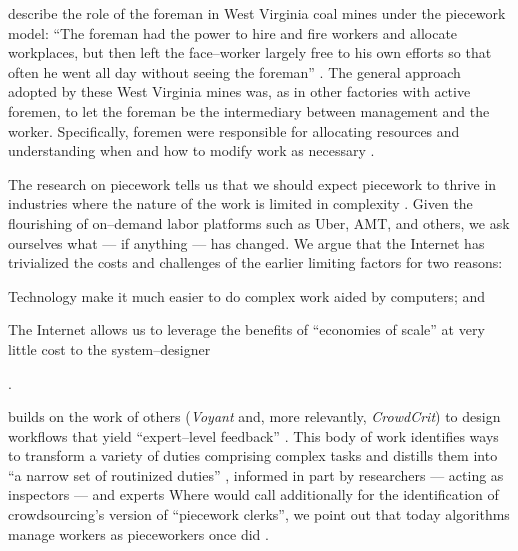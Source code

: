 \documentclass[trackingWork]{subfiles}
\begin{document}
\citeauthor{10.2307/2118435} describe the role of the foreman in West Virginia coal mines under the piecework model:
``The foreman had the power to hire and fire workers and allocate workplaces,
but then left the face--worker largely free to his own efforts so that
often he went all day without seeing the foreman''
\cite{10.2307/2118435}.
The general approach adopted by these West Virginia mines was,
as in other factories with active foremen,
to let the foreman be the intermediary between management and the worker.
Specifically, foremen were responsible for allocating resources and
understanding when and how to modify work as necessary
\cite{wray1949marginal}.


\subsubsubsection{\whatchanged}
The research on piecework tells us that
we should expect piecework to thrive in industries where
the nature of the work is limited in complexity
\cite{Brown01041990}.
Given the flourishing of on--demand labor platforms such as
Uber, AMT, and others, we ask ourselves
what --- if anything --- has changed.
We argue that
the Internet has trivialized
the costs and challenges of the earlier limiting factors for two reasons:
\begin{inlinelist}
  \item Technology make it much easier to do complex work aided by computers; and %
  \item The Internet allows us to leverage the benefits of
        ``economies of scale'' at very little cost
        to the system--designer \cite{lessig2006code,miller2011understanding}
\end{inlinelist}.

\citeauthor{yuanAlmost} builds on the work of others
(\textit{Voyant} and, more relevantly, \textit{CrowdCrit})
to design workflows that yield ``expert--level feedback''
\cite{yuanAlmost,Xu:2014:VGS:2531602.2531604,Luther:2014:CCA:2556420.2556788}.
This body of work identifies ways to transform a variety of duties comprising complex tasks
and distills them into ``a narrow set of routinized duties''%
, informed in part by researchers --- acting as inspectors --- and experts
\cite[quotations from][]{10.2307/23702539}
Where \citeauthor{10.2307/23702539} would call additionally for the identification of
crowdsourcing's version of ``piecework clerks'', we point out that
today algorithms manage workers as pieceworkers once did
\cite{uberAlgorithm,10.2307/23702539}.
\end{document}
